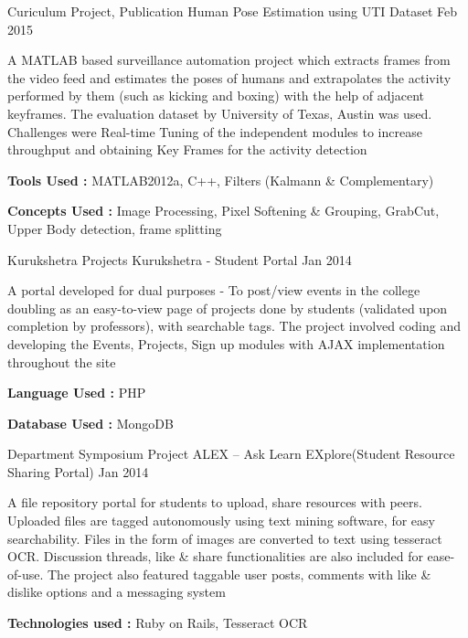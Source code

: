 \begin{cventries}
  \cventry
    {Curiculum Project, Publication} %
    {Human Pose Estimation using UTI Dataset} %
    {} %
    {Feb 2015} %
    {
      \begin{cvitems}
      \item{A MATLAB based surveillance automation project which extracts frames from the video feed and estimates the poses of humans and extrapolates the activity performed by them (such as kicking and boxing) with the help of   adjacent keyframes. The evaluation dataset by University of Texas, Austin was used. Challenges were Real-time   Tuning of the independent modules to increase throughput and obtaining Key Frames for the activity detection}
      \item{\textbf{Tools Used :} MATLAB2012a, C++, Filters (Kalmann \& Complementary)}
      \item{\textbf{Concepts Used :} Image Processing, Pixel Softening \& Grouping, GrabCut, Upper Body detection, frame splitting}
      \end{cvitems}
    }

  \cventry
    {Kurukshetra Projects} %
    {Kurukshetra - Student Portal} %
    {} %
    {Jan 2014} %
    {
      \begin{cvitems}
      \item{A portal developed for dual purposes - To post/view events in the college doubling as an easy-to-view page of projects done by students (validated upon completion by professors), with searchable tags. The project involved coding and developing the Events, Projects, Sign up modules with AJAX implementation throughout the site}
      \item{\textbf{Language Used :} PHP}
      \item{\textbf{Database Used :} MongoDB}
      \end{cvitems}
    }

  \cventry
    {Department Symposium Project} %
    {ALEX – Ask Learn EXplore(Student Resource Sharing Portal)} %
    {} %
    {Jan 2014} %
    {
      \begin{cvitems}
      \item{A file repository portal for students to upload, share resources with peers. Uploaded files are tagged autonomously using text mining software, for easy searchability. Files in the form of images are converted to text using tesseract OCR. Discussion threads, like \& share functionalities are also included for ease-of-use. The project also featured taggable user posts, comments with like \& dislike options and a messaging system}
      \item{\textbf{Technologies used :} Ruby on Rails, Tesseract OCR}
      \end{cvitems}
    }
\end{cventries}
